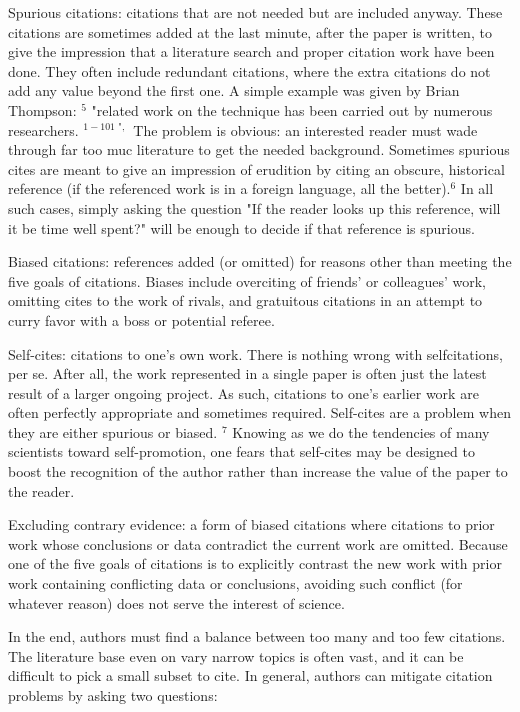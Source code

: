 Spurious citations: citations that are not needed but are included anyway. These citations are sometimes added at the last minute, after the paper is written, to give the impression that a literature search and proper citation work have been done. They often include redundant citations, where the extra citations do not add any value beyond the first one. A simple example was given by Brian Thompson: ${ }^{5}$ "related work on the technique has been carried out by numerous researchers. ${ }^{1-101 \text{ ", }}$ The problem is obvious: an interested reader must wade through far too muc literature to get the needed background. Sometimes spurious cites are meant to give an impression of erudition by citing an obscure, historical reference (if the referenced work is in a foreign language, all the better).$^{6}$ In all such cases, simply asking the question "If the reader looks up this reference, will it be time well spent?" will be enough to decide if that reference is spurious.

Biased citations: references added (or omitted) for reasons other than meeting the five goals of citations. Biases include overciting of friends' or colleagues' work, omitting cites to the work of rivals, and gratuitous citations in an attempt to curry favor with a boss or potential referee.

Self-cites: citations to one's own work. There is nothing wrong with selfcitations, per se. After all, the work represented in a single paper is often just the latest result of a larger ongoing project. As such, citations to one's earlier work are often perfectly appropriate and sometimes required. Self-cites are a problem when they are either spurious or biased. ${ }^{7}$ Knowing as we do the tendencies of many scientists toward self-promotion, one fears that self-cites may be designed to boost the recognition of the author rather than increase the value of the paper to the reader.

Excluding contrary evidence: a form of biased citations where citations to prior work whose conclusions or data contradict the current work are omitted. Because one of the five goals of citations is to explicitly contrast the new work with prior work containing conflicting data or conclusions, avoiding such conflict (for whatever reason) does not serve the interest of science.

In the end, authors must find a balance between too many and too few citations. The literature base even on vary narrow topics is often vast, and it can be difficult to pick a small subset to cite. In general, authors can mitigate citation problems by asking two questions:

